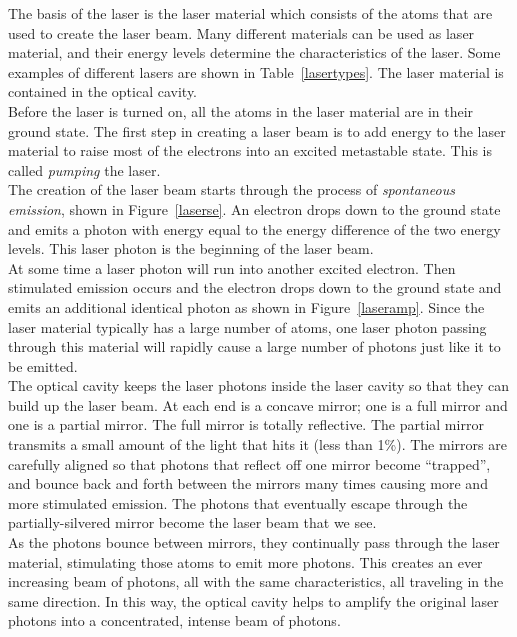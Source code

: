 The basis of the laser is the laser material which consists of the atoms that are used to create the laser beam. Many different materials can be used as laser material, and their energy levels determine the characteristics of the laser. Some examples of different lasers are shown in Table~\ref{lasertypes}. The laser material is contained in the optical cavity.\\ 
 
Before the laser is turned on, all the atoms in the laser material are in their ground state. The first step in creating a laser beam is to add energy to the laser material to raise most of the electrons into an excited metastable state. This is called \textit{pumping} the laser. \\ 

The creation of the laser beam starts through the process of \textit{spontaneous emission}, shown in Figure~\ref{laserse}. An electron drops down to the ground state and emits a photon with energy equal to the energy difference of the two energy levels. This laser photon is the beginning of the laser beam.\\

At some time a laser photon will run into another excited electron. Then stimulated emission occurs and the electron drops down to the ground state and emits an additional identical photon as shown in Figure~\ref{laseramp}. Since the laser material typically has a large number of atoms, one laser photon passing through this material will rapidly cause a large number of photons just like it to be emitted.\\
 
The optical cavity keeps the laser photons inside the laser cavity so that they can build up the laser beam. At each end is a concave mirror; one is a full mirror and one is a partial mirror. The full mirror is totally reflective. The partial mirror transmits a small amount of the light that hits it (less than 1\%). The mirrors are carefully aligned so that photons that reflect off one mirror become ``trapped'', and bounce back and forth between the mirrors many times causing more and more stimulated emission. The photons that eventually escape through the partially-silvered mirror become the laser beam that we see.\\
 
As the photons bounce between mirrors, they continually pass through the laser material, stimulating those atoms to emit more photons.  This creates an ever increasing beam of photons, all with the same characteristics, all traveling in the same direction.  In this way, the optical cavity helps to amplify the original laser photons into a concentrated, intense beam of photons.\\

